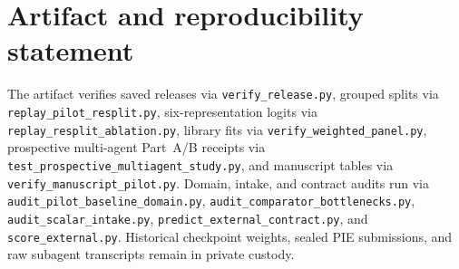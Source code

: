 \documentclass[10pt,journal]{IEEEtran}
\begin{document}
\section*{Artifact and reproducibility statement}

The artifact verifies saved releases via \nolinkurl{verify_release.py}, grouped splits via \nolinkurl{replay_pilot_resplit.py}, six-representation logits via \nolinkurl{replay_resplit_ablation.py}, library fits via \nolinkurl{verify_weighted_panel.py}, prospective multi-agent Part~A/B receipts via \nolinkurl{test_prospective_multiagent_study.py}, and manuscript tables via \nolinkurl{verify_manuscript_pilot.py}. Domain, intake, and contract audits run via \nolinkurl{audit_pilot_baseline_domain.py}, \nolinkurl{audit_comparator_bottlenecks.py}, \nolinkurl{audit_scalar_intake.py}, \nolinkurl{predict_external_contract.py}, and \nolinkurl{score_external.py}. Historical checkpoint weights, sealed PIE submissions, and raw subagent transcripts remain in private custody.



\end{document}
